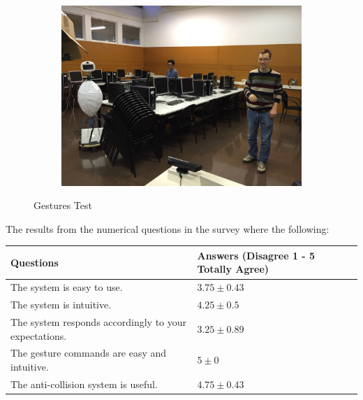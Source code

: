 \begin{figure}[htb!]
\begin{subfigure}[b]{0.3\textwidth}
		\label{fig:gest2}
	\end{subfigure}
	~ %
	\begin{subfigure}[b]{0.3\textwidth}
		\includegraphics[width=\textwidth]{images/4_Gestures_Test.JPG}
		\label{fig:gest3}
	\end{subfigure}
	\caption{Gestures Test}\label{fig:gest}
\end{figure}

The results from the numerical questions in the survey where the following:

\begin{table}[h!]
	\centering
	\begin{tabular}{|l|M{3cm}|N}
		\hline
		\textbf{Questions} & \textbf{Answers} (Disagree 1 - 5 Totally Agree) \\\hline
		The system is easy to use. & $3.75 \pm 0.43$ \\
		The system is intuitive. & $4.25 \pm 0.5$ \\
		The system responds accordingly to your expectations. & $3.25 \pm 0.89$ \\
		The gesture commands are easy and intuitive. & $5 \pm 0$\\
		The anti-collision system is useful. & $4.75 \pm 0.43$\\
		\hline
	\end{tabular}
	\label{tab:survey}
\end{table}

